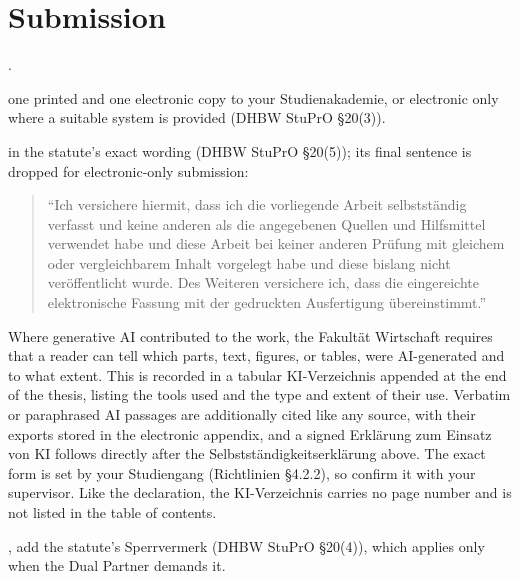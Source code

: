 \documentclass{../sharedAssets/tufte}
\begin{document}
\section{Submission}
. 

 one printed and one electronic copy to your Studienakademie, or electronic only where a suitable system is provided (DHBW StuPrO \S20(3)).

 in the statute's exact wording (DHBW StuPrO \S20(5)); its final sentence is dropped for electronic-only submission:
\begin{quote}
``Ich versichere hiermit, dass ich die vorliegende Arbeit selbstst\"andig verfasst und keine anderen als die angegebenen Quellen und Hilfsmittel verwendet habe und diese Arbeit bei keiner anderen Pr\"ufung mit gleichem oder vergleichbarem Inhalt vorgelegt habe und diese bislang nicht ver\"offentlicht wurde. Des Weiteren versichere ich, dass die eingereichte elektronische Fassung mit der gedruckten Ausfertigung \"ubereinstimmt.''
\end{quote}

 Where generative AI contributed to the work, the Fakult\"at Wirtschaft requires that a reader can tell which parts, text, figures, or tables, were AI-generated and to what extent. This is recorded in a tabular KI-Verzeichnis appended at the end of the thesis, listing the tools used and the type and extent of their use. Verbatim or paraphrased AI passages are additionally cited like any source, with their exports stored in the electronic appendix, and a signed Erkl\"arung zum Einsatz von KI follows directly after the Selbstst\"andigkeitserkl\"arung above. The exact form is set by your Studiengang (Richtlinien \S4.2.2), so confirm it with your supervisor. Like the declaration, the KI-Verzeichnis carries no page number and is not listed in the table of contents.

, add the statute's Sperrvermerk (DHBW StuPrO \S20(4)), which applies only when the Dual Partner demands it.
\end{document}
